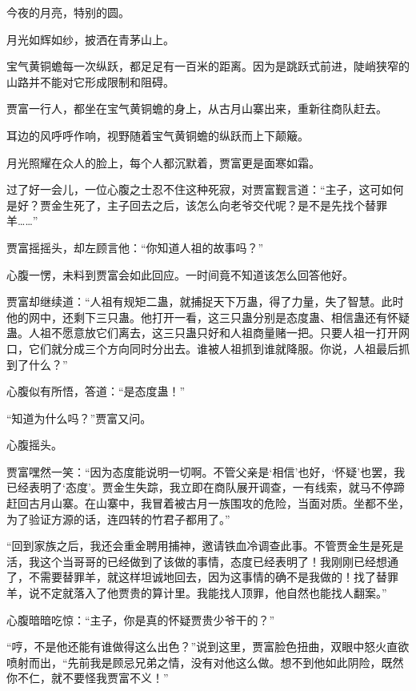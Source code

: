 
\begin{this_body}

今夜的月亮，特别的圆。

月光如辉如纱，披洒在青茅山上。

宝气黄铜蟾每一次纵跃，都足足有一百米的距离。因为是跳跃式前进，陡峭狭窄的山路并不能对它形成限制和阻碍。

贾富一行人，都坐在宝气黄铜蟾的身上，从古月山寨出来，重新往商队赶去。

耳边的风呼呼作响，视野随着宝气黄铜蟾的纵跃而上下颠簸。

月光照耀在众人的脸上，每个人都沉默着，贾富更是面寒如霜。

过了好一会儿，一位心腹之士忍不住这种死寂，对贾富觐言道：“主子，这可如何是好？贾金生死了，主子回去之后，该怎么向老爷交代呢？是不是先找个替罪羊……”

贾富摇摇头，却左顾言他：“你知道人祖的故事吗？”

心腹一愣，未料到贾富会如此回应。一时间竟不知道该怎么回答他好。

贾富却继续道：“人祖有规矩二蛊，就捕捉天下万蛊，得了力量，失了智慧。此时他的网中，还剩下三只蛊。他打开一看，这三只蛊分别是态度蛊、相信蛊还有怀疑蛊。人祖不愿意放它们离去，这三只蛊只好和人祖商量赌一把。只要人祖一打开网口，它们就分成三个方向同时分出去。谁被人祖抓到谁就降服。你说，人祖最后抓到了什么？”

心腹似有所悟，答道：“是态度蛊！”

“知道为什么吗？”贾富又问。

心腹摇头。

贾富嘿然一笑：“因为态度能说明一切啊。不管父亲是‘相信’也好，‘怀疑’也罢，我已经表明了‘态度’。贾金生失踪，我立即在商队展开调查，一有线索，就马不停蹄赶回古月山寨。在山寨中，我冒着被古月一族围攻的危险，当面对质。坐都不坐，为了验证方源的话，连四转的竹君子都用了。”

“回到家族之后，我还会重金聘用捕神，邀请铁血冷调查此事。不管贾金生是死是活，我这个当哥哥的已经做到了该做的事情，态度已经表明了！我刚刚已经想通了，不需要替罪羊，就这样坦诚地回去，因为这事情的确不是我做的！找了替罪羊，说不定就落入了他贾贵的算计里。我能找人顶罪，他自然也能找人翻案。”

心腹暗暗吃惊：“主子，你是真的怀疑贾贵少爷干的？”

“哼，不是他还能有谁做得这么出色？”说到这里，贾富脸色扭曲，双眼中怒火直欲喷射而出，“先前我是顾忌兄弟之情，没有对他这么做。想不到他如此阴险，既然你不仁，就不要怪我贾富不义！”


\end{this_body}
